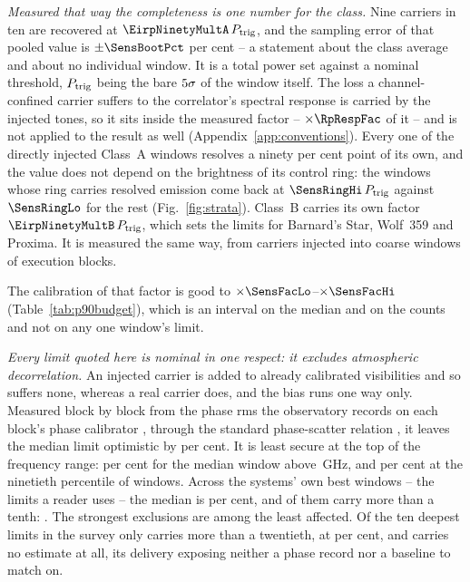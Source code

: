 \emph{Measured that way the completeness is one number for the class.} Nine
carriers in ten are recovered at $\EirpNinetyMultA\,P_{\rm trig}$, and the
sampling error of that pooled value is $\pm\SensBootPct$ per cent -- a
statement about the class average and about no individual window. It is a
total power set against a nominal threshold, $P_{\rm trig}$ being the bare
$5\sigma$ of the window itself. The loss a channel-confined
carrier suffers to the correlator's spectral response is carried by the
injected tones, so it sits inside the measured factor -- $\times\RpRespFac$
of it -- and is not applied to the result as well
(Appendix~\ref{app:conventions}). Every one of the \SensNInj{} directly
injected Class~A windows resolves a ninety per cent point of its own, and the
value does not depend on the brightness of its control ring: the
\SensNRingHi{} windows whose ring carries resolved emission come back at
$\SensRingHi\,P_{\rm trig}$ against $\SensRingLo$ for the rest
(Fig.~\ref{fig:strata}). Class~B carries its own factor $\EirpNinetyMultB\,P_{\rm trig}$, which
sets the limits for Barnard's Star, Wolf~359 and Proxima. It is measured the
same way, from \SensNToneCoarse{} carriers injected into \SensNInjCoarse{}
coarse windows of \SensNInjCoarseBlock{} execution blocks.

The calibration of that factor is good to
$\times\SensFacLo$--$\times\SensFacHi$ (Table~\ref{tab:p90budget}), which is
an interval on the median and on the counts and not on any one window's
limit.

\emph{Every limit quoted here is nominal in one respect: it excludes
atmospheric decorrelation.} An injected carrier is added to already
calibrated visibilities and so suffers none, whereas a real carrier does, and
the bias runs one way only. Measured block by block from the phase rms the
observatory records on each block's phase calibrator
\citep[\S\S10.4.11, 11.3.1]{ALMAHandbook}, through the standard phase-scatter
relation \citep[Eq.~3]{Richards2022}, it leaves the median limit optimistic
by \SensDecorPct{} per cent. It is least secure at the top of the frequency
range: \SensDecorHiPct{} per cent for the median window above
\SensDecorHiGHz\,GHz, and \NmDecHiPct{} per cent at the ninetieth percentile
of windows. Across the systems' own best windows -- the limits a reader uses
-- the median is \NmDecSysMedPct{} per cent, and \NmDecNBigSys{} of them
carry more than a tenth: \NmDecBigSys. The strongest exclusions are among the
least affected. Of the ten deepest limits in the survey only
\NmDecDeepBigSys{} carries more than a twentieth, at \NmDecDeepBigPct{} per
cent, and \NmDecNoRecSys{} carries no estimate at all, its delivery exposing
neither a phase record nor a baseline to match on.

